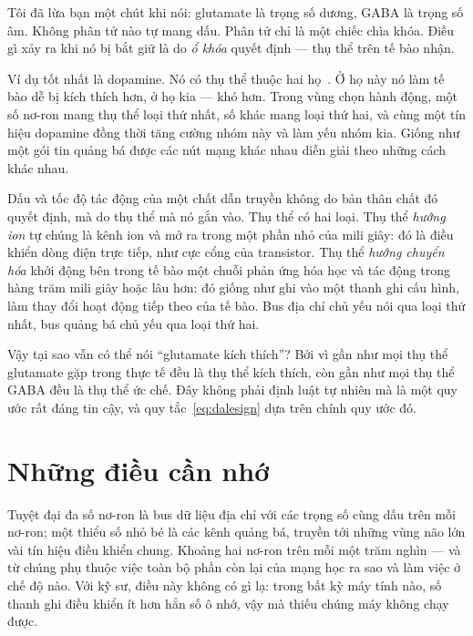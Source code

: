 Tôi đã lừa bạn một chút khi nói: glutamate là trọng số dương, GABA là trọng số âm. Không phân tử nào tự mang dấu. Phân tử chỉ là một chiếc chìa khóa. Điều gì xảy ra khi nó bị bắt giữ là do \emph{ổ khóa} quyết định --- thụ thể trên tế bào nhận.

Ví dụ tốt nhất là dopamine. Nó có thụ thể thuộc hai họ~\cite{Beaulieu2011}. Ở họ này nó làm tế bào dễ bị kích thích hơn, ở họ kia --- khó hơn. Trong vùng chọn hành động, một số nơ-ron mang thụ thể loại thứ nhất, số khác mang loại thứ hai, và cùng một tín hiệu dopamine đồng thời tăng cường nhóm này và làm yếu nhóm kia. Giống như một gói tin quảng bá được các nút mạng khác nhau diễn giải theo những cách khác nhau.

\begin{keyblock}
\begin{proposition}
\label{prop:receptor}
Dấu và tốc độ tác động của một chất dẫn truyền không do bản thân chất đó quyết định, mà do thụ thể mà nó gắn vào. Thụ thể có hai loại. Thụ thể \emph{hướng ion} tự chúng là kênh ion và mở ra trong một phần nhỏ của mili giây: đó là điều khiển dòng điện trực tiếp, như cực cổng của transistor. Thụ thể \emph{hướng chuyển hóa} khởi động bên trong tế bào một chuỗi phản ứng hóa học và tác động trong hàng trăm mili giây hoặc lâu hơn: đó giống như ghi vào một thanh ghi cấu hình, làm thay đổi hoạt động tiếp theo của tế bào. Bus địa chỉ chủ yếu nói qua loại thứ nhất, bus quảng bá chủ yếu qua loại thứ hai.
\end{proposition}
\end{keyblock}

Vậy tại sao vẫn có thể nói ``glutamate kích thích''? Bởi vì gần như mọi thụ thể glutamate gặp trong thực tế đều là thụ thể kích thích, còn gần như mọi thụ thể GABA đều là thụ thể ức chế. Đây không phải định luật tự nhiên mà là một quy ước rất đáng tin cậy, và quy tắc~\eqref{eq:dalesign} dựa trên chính quy ước đó.

\section{Những điều cần nhớ}

Tuyệt đại đa số nơ-ron là bus dữ liệu địa chỉ với các trọng số cùng dấu trên mỗi nơ-ron; một thiểu số nhỏ bé là các kênh quảng bá, truyền tới những vùng não lớn vài tín hiệu điều khiển chung. Khoảng hai nơ-ron trên mỗi một trăm nghìn --- và từ chúng phụ thuộc việc toàn bộ phần còn lại của mạng học ra sao và làm việc ở chế độ nào. Với kỹ sư, điều này không có gì lạ: trong bất kỳ máy tính nào, số thanh ghi điều khiển ít hơn hẳn số ô nhớ, vậy mà thiếu chúng máy không chạy được.

